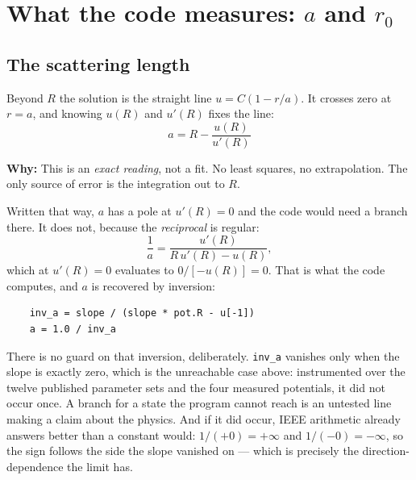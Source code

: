 \documentclass[11pt,a4paper]{article}
\newcommand{\why}[1]{\medskip\noindent\textbf{Why:} #1\medskip}
\begin{document}
\section{What the code measures: $a$ and $r_0$}
\label{sec:r0meaning}

\subsection{The scattering length}
\label{sec:a}

Beyond $R$ the solution is the straight line $u = C(1 - r/a)$. It crosses zero
at $r=a$, and knowing $u(R)$ and $u'(R)$ fixes the line:
\begin{equation}
  \boxed{\;a = R - \frac{u(R)}{u'(R)}\;}
\end{equation}

\why{This is an \emph{exact reading}, not a fit. No least squares, no
extrapolation. The only source of error is the integration out to $R$.}

Written that way, $a$ has a pole at $u'(R)=0$ and the code would need a branch
there. It does not, because the \emph{reciprocal} is regular:
\begin{equation}
  \frac{1}{a} = \frac{u'(R)}{R\,u'(R) - u(R)},
  \label{eq:inva}
\end{equation}
which at $u'(R)=0$ evaluates to $0/[-u(R)] = 0$. That is what the code computes,
and $a$ is recovered by inversion:

\begin{lstlisting}
    inv_a = slope / (slope * pot.R - u[-1])
    a = 1.0 / inv_a
\end{lstlisting}

\noindent
There is no guard on that inversion, deliberately. \texttt{inv\_a} vanishes only
when the slope is exactly zero, which is the unreachable case above:
instrumented over the twelve published parameter sets and the four measured
potentials, it did not occur once. A branch for a state the program cannot
reach is an untested line making a claim about the physics. And if it did
occur, IEEE arithmetic already answers better than a constant would:
$1/(+0)=+\infty$ and $1/(-0)=-\infty$, so the sign follows the side the slope
vanished on --- which is precisely the direction-dependence the limit has.
\end{document}
